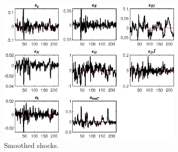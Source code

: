  
\begin{figure}[H]
\centering 
\includegraphics[width=0.80\textwidth]{BRS_sectoral/graphs/BRS_sectoral_SmoothedShocks1}
\caption{Smoothed shocks.}\label{Fig:SmoothedShocks:1}
\end{figure}


